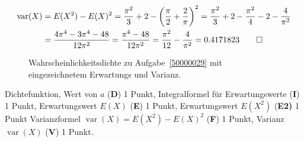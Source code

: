 \begin{loesung}
\begin{teilaufgaben}
\begin{align*}
\operatorname{var}(X)
&=
E(X^2)-E(X)^2
=
\frac{\pi^2}3+2-\biggl(\frac{\pi}{2}+\frac{2}{\pi}\biggr)^2
=
\frac{\pi^2}3+2-\frac{\pi^2}{4}-2-\frac{4}{\pi^2}
\\
&=
\frac{4\pi^4-3\pi^4-48}{12\pi^2}
=
\frac{\pi^4-48}{12\pi^2}=\frac{\pi^2}{12}-\frac{4}{\pi^2}=0.4171823
\qedhere
\end{align*}
\end{teilaufgaben}
\begin{figure}
\centering
{}
\caption{Wahrscheinlichkeitsdichte zu Aufgabe~\ref{50000029} mit
eingezeichnetem Erwartungs und Varianz.
\label{50000029:phievar}}
\end{figure}
\end{loesung}


\begin{bewertung}
Dichtefunktion, Wert von $a$ ({\bf D}) 1 Punkt,
Integralformel für Erwartungswerte ({\bf I}) 1 Punkt,
Erwartungswert $E(X)$ ({\bf E}) 1 Punkt,
Erwartungswert $E(X^2)$ ({\bf E2)} 1 Punkt
Varianzformel $\operatorname{var}(X)=E(X^2)-E(X)^2$ ({\bf F}) 1 Punkt,
Varianz $\operatorname{var}(X)$ ({\bf V}) 1 Punkt.
\end{bewertung}




